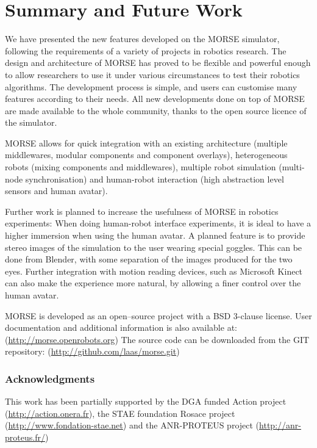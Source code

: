 \documentclass{llncs}
\begin{document}
\section{Summary and Future Work}
\label{section:discussion}

We have presented the new features developed on the MORSE simulator,
following the requirements of a variety of projects in robotics research.
The design and architecture of MORSE has proved to be flexible and powerful
enough to allow researchers to use it under various circumstances to test their
robotics algorithms. The development process is simple, and users can customise
many features according to their needs.
All new developments done on top of MORSE are made available to the whole
community, thanks to the open source licence of the simulator.

MORSE allows for quick integration with an existing architecture (multiple
middlewares, modular components and component overlays), heterogeneous robots
(mixing components and middlewares), multiple robot simulation (multi-node
synchronisation) and human-robot interaction (high abstraction level sensors
and human avatar).

Further work is planned to increase the usefulness of MORSE in robotics
experiments:
When doing human-robot interface experiments, it is ideal to have a higher
immersion when using the human avatar.  A planned feature is to provide stereo
images of the simulation to the user wearing special goggles. This can be done
from Blender, with some separation of the images produced for the two eyes.
Further integration with motion reading devices, such as Microsoft Kinect can
also make the experience more natural, by allowing a finer control over the
human avatar.

MORSE is developed as an open--source project with a BSD 3-clause license.
User documentation and additional information is also available at:
(\url{http://morse.openrobots.org})
The source code can be downloaded from the GIT repository:
(\url{http://github.com/laas/morse.git})

\subsubsection*{Acknowledgments}
This work has been partially supported by the DGA funded Action project
(\url{http://action.onera.fr}), the STAE foundation Rosace project
(\url{http://www.fondation-stae.net}) and the ANR-PROTEUS
project (\url{http://anr-proteus.fr/})

% 


\end{document}
